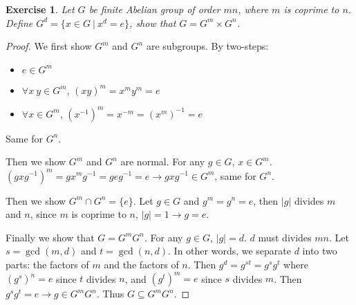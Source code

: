 \documentclass[14pt]{extarticle}
\newtheorem{exercise}{Exercise}[section]
\newcommand{\inv}[1]{#1^{-1}}
\newcommand{\1}{\{ e \}}
\begin{document}
\begin{exercise}
  Let $G$ be finite Abelian group of order $mn$, where $m$ is coprime to $n$.
  Define $G^d = \{ x \in G \ | \ x^d = e \}$, show that $G = G^m \times G^n$.
\end{exercise}
\begin{proof}
  We first show $G^m$ and $G^n$ are subgroups.
  By two-steps:
  \begin{itemize}
    \item $e \in G^m$
    \item $\forall x \ y \in G^m$, $(xy)^m = x^my^m = e$
    \item $\forall x \in G^m$, $(\inv{x})^m = x^{-m} = \inv{(x^m)} = e$
  \end{itemize}
  Same for $G^n$.

  Then we show $G^m$ and $G^n$ are normal.
  For any $g \in G$, $x \in G^m$.
  $(gx\inv{g})^m = gx^m\inv{g} = ge\inv{g} = e \rightarrow gx\inv{g} \in G^m$, same for $G^n$.

  Then we show $G^m \cap G^n = \{ e \}$.
  Let $g \in G$ and $g^m = g^n = e$, then $|g|$ divides $m$ and $n$, 
  since $m$ is coprime to $n$, $|g| = 1 \rightarrow g = e$.

  Finally we show that $G = G^mG^n$.
  For any $g \in G$, $|g| = d$. $d$ must divides $mn$.
  Let $s = \gcd(m, d)$ and $t = \gcd(n, d)$. 
  In other words, we separate $d$ into two parts:
  the factors of $m$ and the factors of $n$.
  Then $g^d = g^{st} = g^sg^t$ where 
  $(g^s)^n = e$ since $t$ divides $n$,
  and $(g^t)^m = e$ since $s$ divides $m$.
  Then $g^sg^t = e \rightarrow g \in G^mG^n$. Thus $G \subseteq G^mG^n$.
\end{proof}
\end{document}
